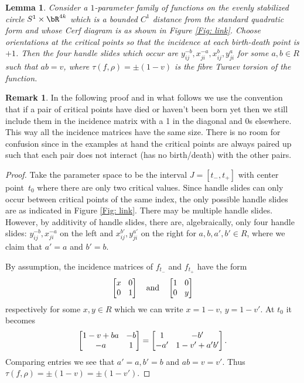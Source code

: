 \documentclass[JEP,XML,SOM,Unicode,NoFloatCountersInSection]{cedram}
\theoremstyle{plain}
\newtheorem{lemma}[theorem]{Lemma}
\theoremstyle{definition}
\newtheorem{remark}[theorem]{Remark}
\newcommand{\mat}[1]{\ensuremath{
\left[\begin{matrix}#1
\end{matrix}\right]
}}
\begin{document}
\begin{lemma}\label{lem: ab=v}
Consider a $1$-parameter family of functions on the evenly stabilized circle $S^1\times \bR^{4k}$ which is a bounded $C^1$ distance from the standard quadratic form and whose Cerf diagram is as shown in Figure \ref{Fig: link}. Choose orientations at the critical points so that the incidence at each birth-death point is $+1$. Then the four handle slides which occur are $y_{ij}^{-b},x_{ji}^{-a}, x_{ij}^{b},y_{ji}^{a}$ for some $a,b\in R$ such that
$ab=v$, where $\tau(f,\rho)=\pm(1-v)$ is the fibre Turaev torsion of the function.
\end{lemma}

\begin{remark}
In the following proof and in what follows we use the convention that if a pair of critical points have died or haven't been born yet then we still include them in the incidence matrix with a 1 in the diagonal and 0s elsewhere. This way all the incidence matrices have the same size. There is no room for confusion since in the examples at hand the critical points are always paired up such that each pair does not interact (\ie has no birth/death) with the other pairs.
\end{remark}

\begin{proof}
Take the parameter space to be the interval $J=[t_-,t_+]$ with center point~$t_0$ where there are only two critical values. Since handle slides can only occur between critical points of the same index, the only possible handle slides are as indicated in Figure \ref{Fig: link}. There may be multiple handle slides. However, by additivity of handle slides, there are, algebraically, only four handle slides: $y_{ij}^{-b}, x_{ji}^{-a}$ on the left and $x_{ij}^{b'},y_{ji}^{a'}$ on the right for $a,b,a',b'\in R$, where we claim that $a'=a$ and $b'=b$.

By assumption, the incidence matrices of $f_{t_-}$ and $f_{t_+}$ have the form
\[\arraycolsep4.5pt
\mat{x&0\\0&1}\quad\text{and}\quad \mat{1 & 0\\0& y}
\]
respectively for some $x,y\in R$ which we can write $x=1-v$, $y=1-v'$. At $t_0$ it becomes
\[\arraycolsep4.5pt
\mat{1-v+ba & -b\\ -a & 1}=\mat{1 & -b'\\ -a' & 1-v'+a'b'}.
\]
Comparing entries we see that $a'=a, b'=b$ and $ab=v=v'$. Thus $\tau(f,\rho)=\pm(1-v )=\pm(1-v' )$.
\end{proof}
\end{document}

